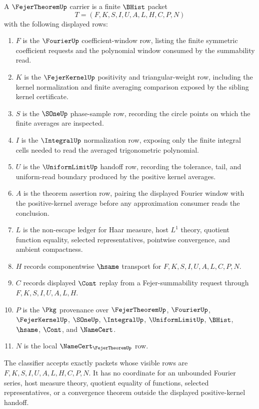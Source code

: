 \begin{definition}
\label{def:fejer-theorem-carrier}
A $\FejerTheoremUp$ carrier is a finite $\BHist$ packet
$$
T=(F,K,S,I,U,A,L,H,C,P,N)
$$
with the following displayed rows:
\begin{enumerate}
\item $F$ is the $\FourierUp$ coefficient-window row, listing the finite symmetric coefficient requests and the polynomial window consumed by the summability read.
\item $K$ is the $\FejerKernelUp$ positivity and triangular-weight row, including the kernel normalization and finite averaging comparison exposed by the sibling kernel certificate.
\item $S$ is the $\SOneUp$ phase-sample row, recording the circle points on which the finite averages are inspected.
\item $I$ is the $\IntegralUp$ normalization row, exposing only the finite integral cells needed to read the averaged trigonometric polynomial.
\item $U$ is the $\UniformLimitUp$ handoff row, recording the tolerance, tail, and uniform-read boundary produced by the positive kernel averages.
\item $A$ is the theorem assertion row, pairing the displayed Fourier window with the positive-kernel average before any approximation consumer reads the conclusion.
\item $L$ is the non-escape ledger for Haar measure, host $L^{1}$ theory, quotient function equality, selected representatives, pointwise convergence, and ambient compactness.
\item $H$ records componentwise $\hsame$ transport for $F,K,S,I,U,A,L,C,P,N$.
\item $C$ records displayed $\Cont$ replay from a Fejer-summability request through $F,K,S,I,U,A,L,H$.
\item $P$ is the $\Pkg$ provenance over $\FejerTheoremUp$, $\FourierUp$, $\FejerKernelUp$, $\SOneUp$, $\IntegralUp$, $\UniformLimitUp$, $\BHist$, $\hsame$, $\Cont$, and $\NameCert$.
\item $N$ is the local $\NameCert_{\FejerTheoremUp}$ row.
\end{enumerate}
The classifier accepts exactly packets whose visible rows are $F,K,S,I,U,A,L,H,C,P,N$. It has no coordinate for an unbounded Fourier series, host measure theory, quotient equality of functions, selected representatives, or a convergence theorem outside the displayed positive-kernel handoff.
\end{definition}

